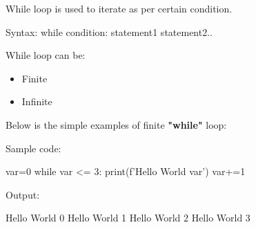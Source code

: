 \setlength{\columnsep}{3pt}

\begin{flushleft}

	

		While loop is used to iterate as per certain condition. 
		\begin{tcolorbox}[breakable,notitle,boxrule=1pt,colback=pink,colframe=pink]
			\color{black}
			\font=8pt
			Syntax: 
			\newline
			while condition:
			\newline
			\hphantom{} \hphantom{}  statement1 \newline
			\hphantom{} \hphantom{}  statement2..
			\font=4pt
		\end{tcolorbox}
		
		\item While loop can be:
		\begin{itemize}
			\item Finite
			\item Infinite
		\end{itemize}

	Below is the simple examples of finite \textbf{"while"} loop:
	\newline
	
	Sample code:
	\begin{tcolorbox}[breakable,notitle,boxrule=-0pt,colback=code,colframe=code]
		\color{white}
		\font=8pt
		var=0 \newline
		while var <= 3: \newline
		\hphantom{} \hphantom{} print(f'Hello World {var}') \newline
		\hphantom{} \hphantom{} var+=1
		\font=4pt
	\end{tcolorbox}

	Output:
	\begin{tcolorbox}[breakable,notitle,boxrule=-0pt,colback=output,colframe=output]
		\color{black}
		Hello World 0 \newline
		Hello World 1 \newline
		Hello World 2 \newline
		Hello World 3
		\font=4pt
	\end{tcolorbox}

	
\end{flushleft}


\newpage


